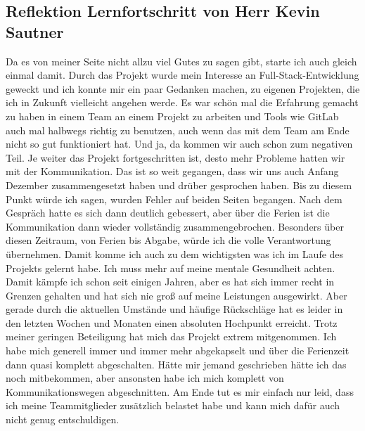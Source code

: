 \newpage
\subsection{Reflektion Lernfortschritt von Herr Kevin Sautner}
Da es von meiner Seite nicht allzu viel Gutes zu sagen gibt, starte ich auch gleich einmal damit. 
Durch das Projekt wurde mein Interesse an Full-Stack-Entwicklung geweckt und ich konnte mir ein paar Gedanken machen, zu eigenen Projekten, die ich in Zukunft vielleicht angehen werde. 
Es war schön mal die Erfahrung gemacht zu haben in einem Team an einem Projekt zu arbeiten und Tools wie GitLab auch mal halbwegs richtig zu benutzen, auch wenn das mit dem Team am Ende nicht so gut funktioniert hat.
Und ja, da kommen wir auch schon zum negativen Teil. \newline
Je weiter das Projekt fortgeschritten ist, desto mehr Probleme hatten wir mit der Kommunikation. Das ist so weit gegangen, dass wir uns auch Anfang Dezember zusammengesetzt haben und drüber gesprochen haben. 
Bis zu diesem Punkt würde ich sagen, wurden Fehler auf beiden Seiten begangen. 
Nach dem Gespräch hatte es sich dann deutlich gebessert, aber über die Ferien ist die Kommunikation dann wieder vollständig zusammengebrochen.
Besonders über diesen Zeitraum, von Ferien bis Abgabe, würde ich die volle Verantwortung übernehmen. 
Damit komme ich auch zu dem wichtigsten was ich im Laufe des Projekts gelernt habe. \newline
Ich muss mehr auf meine mentale Gesundheit achten. Damit kämpfe ich schon seit einigen Jahren, aber es hat sich immer recht in Grenzen gehalten und hat sich nie groß auf meine Leistungen ausgewirkt. 
Aber gerade durch die aktuellen Umstände und häufige Rückschläge hat es leider in den letzten Wochen und Monaten einen absoluten Hochpunkt erreicht. 
Trotz meiner geringen Beteiligung hat mich das Projekt extrem mitgenommen. 
Ich habe mich generell immer und immer mehr abgekapselt und über die Ferienzeit dann quasi komplett abgeschalten. 
Hätte mir jemand geschrieben hätte ich das noch mitbekommen, aber ansonsten habe ich mich komplett von Kommunikationswegen abgeschnitten. \newline
Am Ende tut es mir einfach nur leid, dass ich meine Teammitglieder zusätzlich belastet habe und kann mich dafür auch nicht genug entschuldigen.
